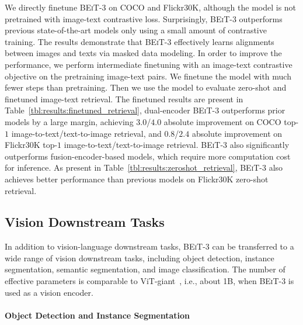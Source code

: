 \documentclass{article}
\newcommand\our{\textsc{BEiT-3}}
\begin{document}
We directly finetune \our{} on COCO and Flickr30K, although the model is not pretrained with image-text contrastive loss.
Surprisingly, \our{} outperforms previous state-of-the-art models only using a small amount of contrastive training.
The results demonstrate that \our{} effectively learns alignments between images and texts via masked data modeling. 
In order to improve the performance, we perform intermediate finetuning with an image-text contrastive objective on the pretraining image-text pairs.
We finetune the model with much fewer steps than pretraining.
Then we use the model to evaluate zero-shot and finetuned image-text retrieval.
The finetuned results are present in Table~\ref{tbl:results:finetuned_retrieval}, dual-encoder \our{} outperforms prior models by a large margin, achieving $3.0$/$4.0$ absolute improvement on COCO top-$1$ image-to-text/text-to-image retrieval, and $0.8$/$2.4$ absolute improvement on Flickr30K top-$1$ image-to-text/text-to-image retrieval.
\our{} also significantly outperforms fusion-encoder-based models, which require more computation cost for inference.
As present in Table~\ref{tbl:results:zeroshot_retrieval}, \our{} also achieves better performance than previous models on Flickr30K zero-shot retrieval.


\subsection{Vision Downstream Tasks}
\label{exp:vision}

In addition to vision-language downstream tasks, \our{} can be transferred to a wide range of vision downstream tasks, including object detection, instance segmentation, semantic segmentation, and image classification.
The number of effective parameters is comparable to ViT-giant~\citep{scaling:vit}, i.e., about 1B, when \our{} is used as a vision encoder.

\paragraph{Object Detection and Instance Segmentation} 
\end{document}
